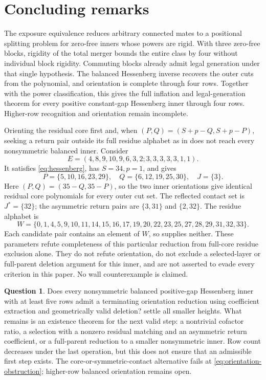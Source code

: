 \documentclass[11pt,a4paper]{amsart}
\numberwithin{equation}{section}
\theoremstyle{plain}
\theoremstyle{definition}
\newtheorem{question}[theorem]{Question}
\begin{document}
\section{Concluding remarks}\label{sec:conclusion}

The exposure equivalence reduces arbitrary connected mates to a positional splitting problem for zero-free inners whose powers are rigid.  With three zero-free blocks, rigidity of the total merger bounds the entire class by four without individual block rigidity.  Commuting blocks already admit legal generation under that single hypothesis.  The balanced Hessenberg inverse recovers the outer cuts from the polynomial, and orientation is complete through four rows.  Together with the power classification, this gives the full inflation and legal-generation theorem for every positive constant-gap Hessenberg inner through four rows.  Higher-row recognition and orientation remain incomplete.

Orienting the residual core first and, when \((P,Q)=(S+p-Q,S+p-P)\), seeking a return pair outside its full residue alphabet as in  does not reach every nonsymmetric balanced inner.  Consider
\begin{equation}\label{eq:orientation-obstruction}
 E=(4,8,9,10,9,6,3,2;3,3,3,3,3,1,1).
\end{equation}
It satisfies \eqref{eq:hessenberg}, has \(S=34,p=1\), and gives
\[
 P=\{5,10,16,23,29\},\quad
 Q=\{6,12,19,25,30\},\quad J=\{3\}.
\]
Here \((P,Q)=(35-Q,35-P)\), so the two inner orientations give identical residual core polynomials for every outer cut set.  The reflected contact set is \(J^*=\{32\}\); the asymmetric return pairs are \(\{3,31\}\) and \(\{2,32\}\).  The residue alphabet is
\[
 W=\{0,1,4,5,9,10,11,14,15,16,17,19,20,22,23,25,27,28,29,31,32,33\}.
\]
Each candidate pair contains an element of \(W\), so  supplies neither.  These parameters refute completeness of this particular reduction from full-core residue exclusion alone.  They do not refute orientation, do not exclude a selected-layer or full-parent deletion argument for this inner, and are not asserted to evade every criterion in this paper.  No wall counterexample is claimed.

\begin{question}\label{q:orientation}
Does every nonsymmetric balanced positive-gap Hessenberg inner with at least five rows admit a terminating orientation reduction using coefficient extraction and geometrically valid deletion?   settle all smaller heights.  What remains is an existence theorem for the next valid step: a nontrivial cofactor ratio, a selection with a nonzero residual matching and an asymmetric return coefficient, or a full-parent reduction to a smaller nonsymmetric inner.  Row count decreases under the last operation, but this does not ensure that an admissible first step exists.  The core-or-symmetric-contact alternative fails at \eqref{eq:orientation-obstruction}; higher-row balanced orientation remains open.
\end{question}
\end{document}
